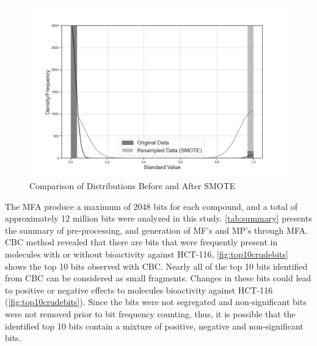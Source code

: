 \FloatBarrier
\begin{figure}[h]
	\centering
	\begin{minipage}{\textwidth}
		\centering
		\includegraphics[width=1\textwidth]{SMOTEbw.png}
		\vspace{-1cm}
		\caption{Comparison of Distributions Before and After SMOTE}
		\label{fig:SMOTE}
	\end{minipage}
\end{figure}
\FloatBarrier


The MFA produce a maximum of 2048 bits for each compound, and a total of approximately 12 million bits were analyzed in this study. \autoref{tab:summary} presents the summary of pre-processing, and generation of MF's and MP's through MFA. CBC method revealed that there are bits that were frequently present in molecules with or without bioactivity against HCT-116, \autoref{fig:top10crudebits} shows the top 10 bits observed with CBC. Nearly all of the top 10 bits identified from CBC can be considered as small fragments. Changes in these bits could lead to positive or negative effects to molecules bioactivity against HCT-116 (\autoref{fig:top10crudebits}). Since the bits were not segregated and non-significant bits were not removed prior to bit frequency counting, thus, it is possible that the identified top 10 bits contain a mixture of positive, negative and non-significant bits. 

